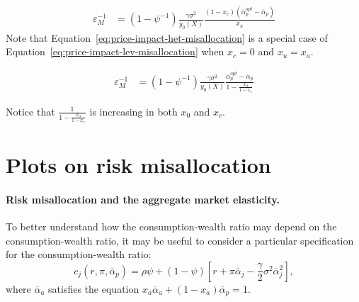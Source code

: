 \begin{align}		
    \varepsilon_M^{-1}&=
    \left(1-\psi^{-1}\right) \frac{\gamma \sigma^{2}}{y_{0}(X)}\frac{(1-x_c)(\overline{\alpha}_p^{opt}-\overline{\alpha}_{p})}{x_u}\label{eq:price-impact-lev-misallocation}
		\end{align}		
Note that Equation~\eqref{eq:price-impact-het-misallocation} is a special case of Equation~\eqref{eq:price-impact-lev-misallocation} when $x_c=0$ and $x_u=x_a$.

  \begin{align}		
		\varepsilon_M^{-1}&=
		\left(1-\psi^{-1}\right) \frac{\gamma \sigma^{2}}{y_{0}(X)}\frac{\overline{\alpha}_p^{opt}-\overline{\alpha}_{p}}{1-\frac{x_0}{1-x_c} } 
		\end{align}		

Notice that $\frac{1}{1-\frac{x_0}{1-x_c}}$ is increasing in both $x_0$ and $x_c$. 

\section{Plots on risk misallocation}

\paragraph{Risk misallocation and the aggregate market elasticity.} To better understand how the consumption-wealth ratio may depend on the consumption-wealth ratio, it may be useful to consider a particular specification for the consumption-wealth ratio:
\begin{equation}
    c_j(r, \pi, \overline{\alpha}_p) = \rho \psi + (1-\psi) \left[ r + \pi \overline{\alpha}_j  - \frac{\gamma}{2} \sigma^2 \overline{\alpha}_j^2 \right],
\end{equation}
where $\overline{\alpha}_a$ satisfies the equation $x_a \overline{\alpha}_a + (1-x_a) \overline{\alpha}_p = 1$.

